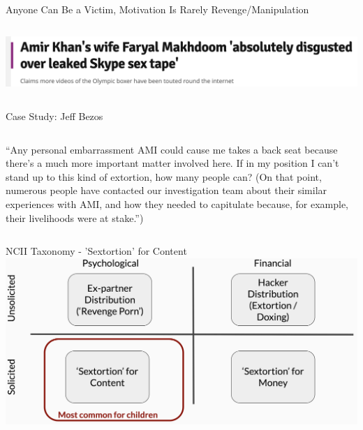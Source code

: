 \documentclass[nobackground,dvipsnames,table,aspectratio=169]{beamer}
\begin{document}
\begin{frame}{Anyone Can Be a Victim, Motivation Is Rarely Revenge/Manipulation}
\begin{columns}
            \includegraphics[width=\textwidth]{amir-khan-headline}
    \end{columns}
\end{frame}

\begin{frame}{Case Study: Jeff Bezos}
    \begin{columns}
            “Any personal embarrassment AMI could cause me takes a back seat because there’s a much more important matter involved here. If in my position I can’t stand up to this kind of extortion, how many people can? (On that point, numerous people have contacted our investigation team about their similar experiences with AMI, and how they needed to capitulate because, for example, their livelihoods were at stake.”)
    \end{columns}
\end{frame}

\begin{frame}{NCII Taxonomy - 'Sextortion' for Content}
    \includegraphics[width=\textwidth]{ncii-taxonomy-5}
\end{frame}
\end{document}
